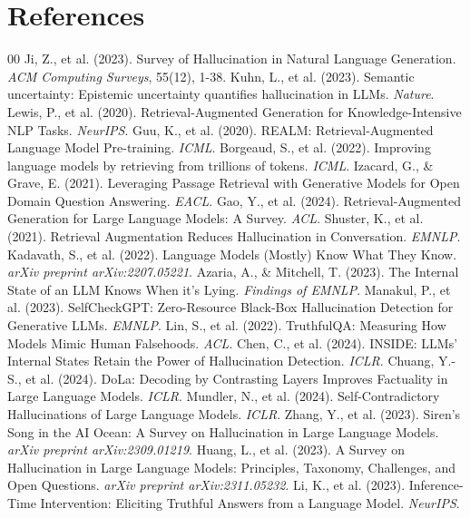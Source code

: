 \documentclass[11pt,a4paper]{article}
\begin{document}
\section{References}
\begin{thebibliography}{00}
 Ji, Z., et al. (2023). Survey of Hallucination in Natural Language Generation. \textit{ACM Computing Surveys}, 55(12), 1-38.
 Kuhn, L., et al. (2023). Semantic uncertainty: Epistemic uncertainty quantifies hallucination in LLMs. \textit{Nature}.
 Lewis, P., et al. (2020). Retrieval-Augmented Generation for Knowledge-Intensive NLP Tasks. \textit{NeurIPS}.
 Guu, K., et al. (2020). REALM: Retrieval-Augmented Language Model Pre-training. \textit{ICML}.
 Borgeaud, S., et al. (2022). Improving language models by retrieving from trillions of tokens. \textit{ICML}.
 Izacard, G., \& Grave, E. (2021). Leveraging Passage Retrieval with Generative Models for Open Domain Question Answering. \textit{EACL}.
 Gao, Y., et al. (2024). Retrieval-Augmented Generation for Large Language Models: A Survey. \textit{ACL}.
 Shuster, K., et al. (2021). Retrieval Augmentation Reduces Hallucination in Conversation. \textit{EMNLP}.
 Kadavath, S., et al. (2022). Language Models (Mostly) Know What They Know. \textit{arXiv preprint arXiv:2207.05221}.
 Azaria, A., \& Mitchell, T. (2023). The Internal State of an LLM Knows When it's Lying. \textit{Findings of EMNLP}.
 Manakul, P., et al. (2023). SelfCheckGPT: Zero-Resource Black-Box Hallucination Detection for Generative LLMs. \textit{EMNLP}.
 Lin, S., et al. (2022). TruthfulQA: Measuring How Models Mimic Human Falsehoods. \textit{ACL}.
 Chen, C., et al. (2024). INSIDE: LLMs' Internal States Retain the Power of Hallucination Detection. \textit{ICLR}.
 Chuang, Y.-S., et al. (2024). DoLa: Decoding by Contrasting Layers Improves Factuality in Large Language Models. \textit{ICLR}.
 Mundler, N., et al. (2024). Self-Contradictory Hallucinations of Large Language Models. \textit{ICLR}.
 Zhang, Y., et al. (2023). Siren's Song in the AI Ocean: A Survey on Hallucination in Large Language Models. \textit{arXiv preprint arXiv:2309.01219}.
 Huang, L., et al. (2023). A Survey on Hallucination in Large Language Models: Principles, Taxonomy, Challenges, and Open Questions. \textit{arXiv preprint arXiv:2311.05232}.
 Li, K., et al. (2023). Inference-Time Intervention: Eliciting Truthful Answers from a Language Model. \textit{NeurIPS}.

\end{thebibliography}
\end{document}
